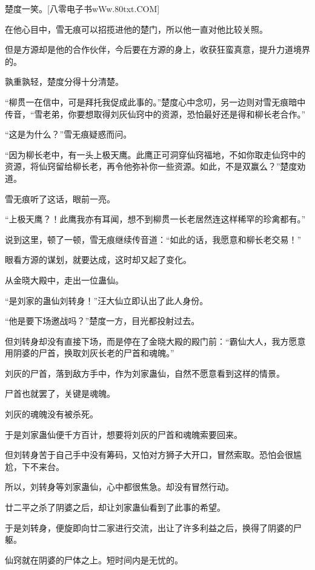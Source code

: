
\begin{this_body}

楚度一笑。[八零电子书wWw.80txt.COM]

在他心目中，雪无痕可以招揽进他的楚门，所以他一直对他比较关照。

但是方源却是他的合作伙伴，今后要在方源的身上，收获狂蛮真意，提升力道境界的。

孰重孰轻，楚度分得十分清楚。

“柳贯一在信中，可是拜托我促成此事的。”楚度心中念叨，另一边则对雪无痕暗中传音，“雪老弟，你要想取得刘灰仙窍中的资源，恐怕最好还是得和柳长老合作。”

“这是为什么？”雪无痕疑惑而问。

“因为柳长老中，有一头上极天鹰。此鹰正可洞穿仙窍福地，不如你取走仙窍中的资源，将仙窍留给柳长老，再令他弥补你一些资源。如此，不是双赢么？”楚度劝道。

雪无痕听了这话，眼前一亮。

“上极天鹰？！此鹰我亦有耳闻，想不到柳贯一长老居然连这样稀罕的珍禽都有。”

说到这里，顿了一顿，雪无痕继续传音道：“如此的话，我愿意和柳长老交易！”

眼看方源的谋划，就要达成，这时却又起了变化。

从金晓大殿中，走出一位蛊仙。

“是刘家的蛊仙刘转身！”汪大仙立即认出了此人身份。

“他是要下场邀战吗？”楚度一方，目光都投射过去。

但刘转身却没有直接下场，而是停在了金晓大殿的殿门前：“霸仙大人，我方愿意用阴婆的尸首，换取刘灰长老的尸首和魂魄。”

刘灰的尸首，落到敌方手中，作为刘家蛊仙，自然不愿意看到这样的情景。

尸首也就罢了，关键是魂魄。

刘灰的魂魄没有被杀死。

于是刘家蛊仙便千方百计，想要将刘灰的尸首和魂魄索要回来。

但刘转身苦于自己手中没有筹码，又怕对方狮子大开口，冒然索取。恐怕会很尴尬，下不来台。

所以，刘转身等刘家蛊仙，心中都很焦急。却没有冒然行动。

廿二平之杀了阴婆之后，却让刘家蛊仙看到了此事的希望。

于是刘转身，便旋即向廿二家进行交流，出让了许多利益之后，换得了阴婆的尸躯。

仙窍就在阴婆的尸体之上。短时间内是无忧的。


\end{this_body}

